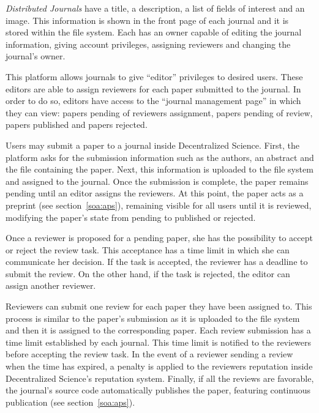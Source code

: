 \emph{Distributed Journals} have a title, a description, a list of fields of
interest and an image. This information is shown in the front page of each
journal and it is stored within the file system. Each 
has an owner capable of editing the journal information, giving account
privileges, assigning reviewers and changing the journal's owner.

\label{cha:platform-description-5}

This platform allows journals to give ``editor'' privileges to desired users.
These editors are able to assign reviewers for each paper submitted to the
journal. In order to do so, editors have access to the ``journal management
page'' in which they can view: papers pending of reviewers assignment, papers
pending of review, papers published and papers rejected.

\label{cha:platform-description-4}

Users may submit a paper to a journal inside Decentralized Science. First, the
platform asks for the submission information such as the authors, an abstract
and the file containing the paper. Next, this information is uploaded to the
file system and assigned to the journal. Once the submission is complete, the
paper remains pending until an editor assigns the reviewers. At this point, the
paper acts as a preprint (see section~\ref{soa:aps}), remaining visible for all
users until it is reviewed, modifying the paper's state from pending to
published or rejected.

\label{cha:platform-description-3}

Once a reviewer is proposed for a pending paper, she has the possibility to
accept or reject the review task. This acceptance has a time limit in which she
can communicate her decision. If the task is accepted, the reviewer has a
deadline to submit the review. On the other hand, if the task is rejected, the
editor can assign another reviewer.

\label{cha:platform-description-2}

Reviewers can submit one review for each paper they have been assigned to. This
process is similar to the paper's submission as it is uploaded to the file
system and then it is assigned to the corresponding paper. Each review
submission has a time limit established by each journal. This time limit is
notified to the reviewers before accepting the review task. In the event of a
reviewer sending a review when the time has expired, a penalty is applied to the
reviewers reputation inside Decentralized Science's reputation system. Finally,
if all the reviews are favorable, the journal's source code automatically
publishes the paper, featuring continuous publication (see
section~\ref{soa:aps}).

